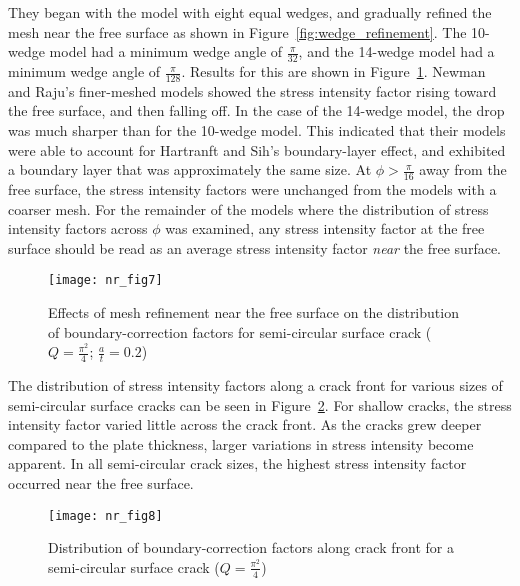 They began with the model with eight equal wedges, and gradually refined the mesh near the free surface as shown in Figure~\ref{fig:wedge_refinement}.
The 10-wedge model had a minimum wedge angle of $\frac{\pi}{32}$, and the 14-wedge model had a minimum wedge angle of $\frac{\pi}{128}$.
Results for this are shown in Figure~\ref{fig:effects_of_mesh_refinement}.
Newman and Raju's finer-meshed models showed the stress intensity factor rising toward the free surface, and then falling off.
In the case of the 14-wedge model, the drop was much sharper than for the 10-wedge model.
This indicated that their models were able to account for Hartranft and Sih's bound\-ary-layer effect, and exhibited a boundary layer that was approximately the same size.
At $\phi>\frac{\pi}{16}$ away from the free surface, the stress intensity factors were unchanged from the models with a coarser mesh.
For the remainder of the models where the distribution of stress intensity factors across $\phi$ was examined, any stress intensity factor at the free surface should be read as an average stress intensity factor \emph{near} the free surface.
\begin{figure}[tbp]
\centering
	   \texttt{[image: nr\_fig7]}
      \caption{Effects of mesh refinement near the free surface on the distribution of bound\-ary-cor\-rec\-tion factors for semi-circu\-lar surface crack ($Q=\frac{\pi^2}{4}$; $\frac{a}{t}=0.2$)}
      \label{fig:effects_of_mesh_refinement}
\end{figure}

The distribution of stress intensity factors along a crack front for various sizes of semi-circular surface cracks can be seen in Figure~\ref{fig:sif_circular}.
For shallow cracks, the stress intensity factor varied little across the crack front.
As the cracks grew deeper compared to the plate thickness, larger variations in stress intensity become apparent.
In all semi-circular crack sizes, the highest stress intensity factor occurred near the free surface.
\begin{figure}[tbp]
\centering
	   \texttt{[image: nr\_fig8]}
      \caption{Distribution of bound\-ary-cor\-rec\-tion factors along crack front for a semi-circu\-lar surface crack ($Q=\frac{\pi^2}{4}$)}
      \label{fig:sif_circular}
\end{figure}

